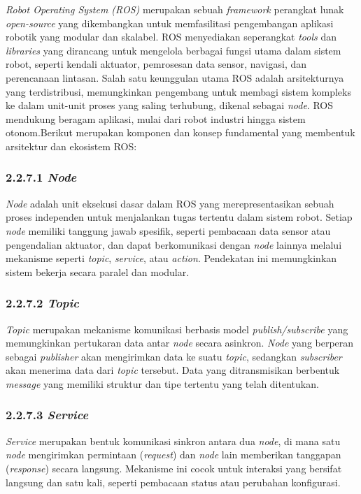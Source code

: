 \emph{Robot Operating System (ROS)} merupakan sebuah \emph{framework} perangkat lunak \emph{open-source} yang dikembangkan untuk memfasilitasi pengembangan aplikasi robotik yang modular dan skalabel. ROS menyediakan seperangkat \emph{tools} dan \emph{libraries} yang dirancang untuk mengelola berbagai fungsi utama dalam sistem robot, seperti kendali aktuator, pemrosesan data sensor, navigasi, dan perencanaan lintasan. Salah satu keunggulan utama ROS adalah arsitekturnya yang terdistribusi, memungkinkan pengembang untuk membagi sistem kompleks ke dalam unit-unit proses yang saling terhubung, dikenal sebagai \emph{node}. ROS mendukung beragam aplikasi, mulai dari robot industri hingga sistem otonom.Berikut merupakan komponen dan konsep fundamental yang membentuk arsitektur dan ekosistem ROS:

\subsubsection{2.2.7.1 \emph{Node}}
\emph{Node} adalah unit eksekusi dasar dalam ROS yang merepresentasikan sebuah proses independen untuk menjalankan tugas tertentu dalam sistem robot. Setiap \emph{node} memiliki tanggung jawab spesifik, seperti pembacaan data sensor atau pengendalian aktuator, dan dapat berkomunikasi dengan \emph{node} lainnya melalui mekanisme seperti \emph{topic}, \emph{service}, atau \emph{action}. Pendekatan ini memungkinkan sistem bekerja secara paralel dan modular.

\subsubsection{2.2.7.2 \emph{Topic}}
\emph{Topic} merupakan mekanisme komunikasi berbasis model \emph{publish/subscribe} yang memungkinkan pertukaran data antar \emph{node} secara asinkron. \emph{Node} yang berperan sebagai \emph{publisher} akan mengirimkan data ke suatu \emph{topic}, sedangkan \emph{subscriber} akan menerima data dari \emph{topic} tersebut. Data yang ditransmisikan berbentuk \emph{message} yang memiliki struktur dan tipe tertentu yang telah ditentukan.

\subsubsection{2.2.7.3 \emph{Service}}
\emph{Service} merupakan bentuk komunikasi sinkron antara dua \emph{node}, di mana satu \emph{node} mengirimkan permintaan (\emph{request}) dan \emph{node} lain memberikan tanggapan (\emph{response}) secara langsung. Mekanisme ini cocok untuk interaksi yang bersifat langsung dan satu kali, seperti pembacaan status atau perubahan konfigurasi.

